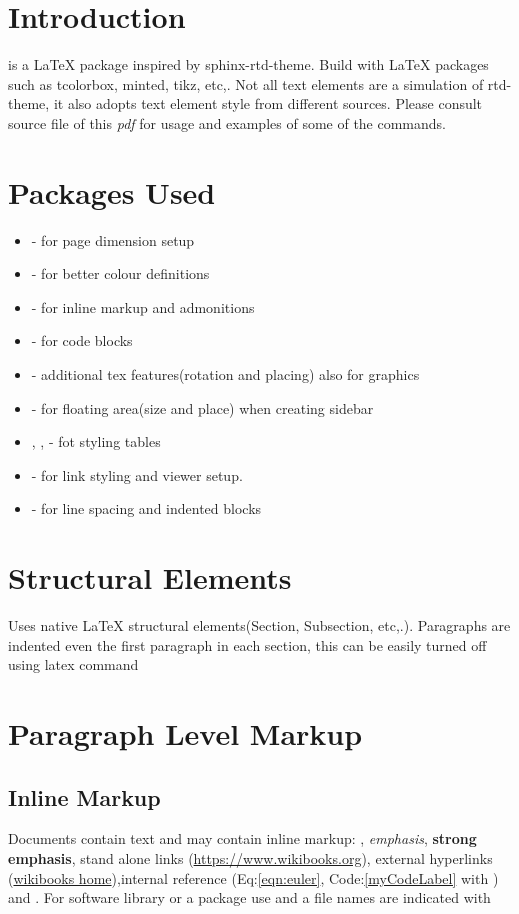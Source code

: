 \documentclass[12pt,a4paper]{report}
\begin{document}
%
\tableofcontents

\section{Introduction}
 is a {\LaTeX} package inspired by sphinx-rtd-theme. Build with {\LaTeX} packages such as tcolorbox, minted, tikz, etc,. Not all text elements are a simulation of rtd-theme, it also adopts text element style from different sources. Please consult  source file of this \emph{pdf} for usage and examples of some of the commands.
\section{Packages Used}
\begin{itemize}
	\item {} - for page dimension setup
	\item {} - for better colour definitions
	\item {} - for inline markup and admonitions
	\item {} - for code blocks
	\item {} - additional tex features(rotation and placing) also for graphics
	\item {} - for floating area(size and place) when creating sidebar
	\item {}, ,  - fot styling tables
	\item {} - for link styling and viewer setup.
	\item {} - for line spacing and indented blocks
\end{itemize}

\section{Structural Elements}
Uses native LaTeX structural elements(Section, Subsection, etc,.). Paragraphs are indented even the first paragraph in each section, this can be easily turned off using  latex command
\section{Paragraph Level Markup}

\subsection{Inline Markup}
Documents contain text and may contain inline markup: , \emph{emphasis}, \textbf{strong emphasis}, stand alone links (\url{https://www.wikibooks.org}), external hyperlinks (\href{https://www.wikibooks.org}{wikibooks home}),internal reference (Eq:\ref{eqn:euler}, Code:\ref{myCodeLabel} with ) and . For software library or a package use  and a file names are indicated with 
\end{document}
